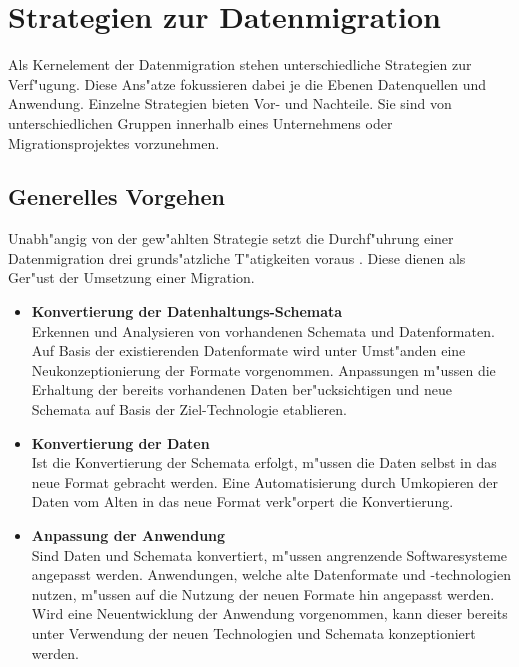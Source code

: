 \section{Strategien zur Datenmigration}
\label{chapter:strategien}

Als Kernelement der Datenmigration stehen unterschiedliche Strategien zur Verf"ugung. Diese Ans"atze fokussieren dabei je die Ebenen Datenquellen und Anwendung. Einzelne Strategien bieten Vor- und Nachteile. Sie sind von unterschiedlichen Gruppen innerhalb eines Unternehmens oder Migrationsprojektes vorzunehmen.

\subsection{Generelles Vorgehen}

Unabh"angig von der gew"ahlten Strategie setzt die Durchf"uhrung einer Datenmigration drei grunds"atzliche T"atigkeiten voraus \citep{henrard-2002}. Diese dienen als Ger"ust der Umsetzung einer Migration. 

\begin{itemize}
	\item \textbf{Konvertierung der Datenhaltungs-Schemata} \\
	Erkennen und Analysieren von vorhandenen Schemata und Datenformaten. Auf Basis der existierenden Datenformate wird unter Umst"anden eine Neukonzeptionierung der Formate vorgenommen. Anpassungen m"ussen die Erhaltung der bereits vorhandenen Daten ber"ucksichtigen und neue Schemata auf Basis der Ziel-Technologie etablieren.
	\item \textbf{Konvertierung der Daten} \\
	Ist die Konvertierung der Schemata erfolgt, m"ussen die Daten selbst in das neue Format gebracht werden. Eine Automatisierung durch Umkopieren der Daten vom Alten in das neue Format verk"orpert die Konvertierung.
	\item \textbf{Anpassung der Anwendung} \\
	Sind Daten und Schemata konvertiert, m"ussen angrenzende Softwaresysteme angepasst werden. Anwendungen, welche alte Datenformate und -technologien nutzen, m"ussen auf die Nutzung der neuen Formate hin angepasst werden. Wird eine Neuentwicklung der Anwendung vorgenommen, kann dieser bereits unter Verwendung der neuen Technologien und Schemata konzeptioniert werden.
\end{itemize}

